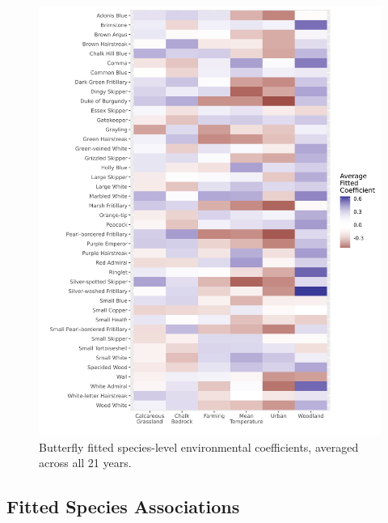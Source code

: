 \documentclass[
]{article}
\begin{document}
\begin{figure}
\centering
\includegraphics[width=\textwidth,height=0.7\textheight]{ButterflyMarkdowns/ButterflySIFigs/EnvCoeffs.png}
\caption{Butterfly fitted species-level environmental coefficients,
averaged across all 21 years.}
\end{figure}

\hypertarget{fitted-species-associations}{%
\subsection{Fitted Species
Associations}\label{fitted-species-associations}}
\end{document}
